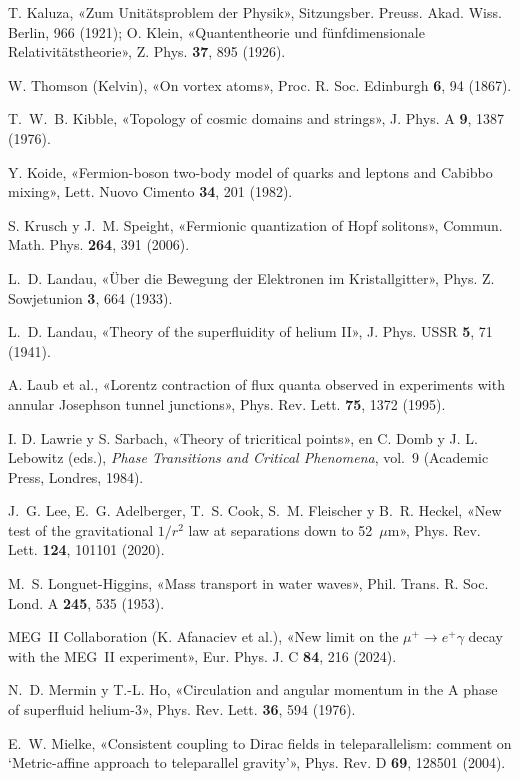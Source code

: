 \documentclass[11pt,a4paper]{article}
\begin{document}
\begin{list}{}{\setlength{\leftmargin}{1.5em}\setlength{\itemindent}{-1.5em}\setlength{\itemsep}{0.15em}\small}
\item T. Kaluza, «Zum Unitätsproblem der Physik», Sitzungsber. Preuss. Akad. Wiss. Berlin, 966 (1921); O. Klein, «Quantentheorie und fünfdimensionale Relativitätstheorie», Z. Phys. \textbf{37}, 895 (1926).
\item W. Thomson (Kelvin), «On vortex atoms», Proc. R. Soc. Edinburgh \textbf{6}, 94 (1867).
\item T.~W.~B. Kibble, «Topology of cosmic domains and strings», J. Phys. A \textbf{9}, 1387 (1976).
\item Y. Koide, «Fermion-boson two-body model of quarks and leptons and Cabibbo mixing», Lett. Nuovo Cimento \textbf{34}, 201 (1982).
\item S. Krusch y J.~M. Speight, «Fermionic quantization of Hopf solitons», Commun. Math. Phys. \textbf{264}, 391 (2006).
\item L.~D. Landau, «Über die Bewegung der Elektronen im Kristallgitter», Phys. Z. Sowjetunion \textbf{3}, 664 (1933).
\item L.~D. Landau, «Theory of the superfluidity of helium II», J. Phys. USSR \textbf{5}, 71 (1941).
\item A. Laub et al., «Lorentz contraction of flux quanta observed in experiments with annular Josephson tunnel junctions», Phys. Rev. Lett. \textbf{75}, 1372 (1995).
\item I. D. Lawrie y S. Sarbach, «Theory of tricritical points», en C. Domb y J. L. Lebowitz (eds.), \emph{Phase Transitions and Critical Phenomena}, vol.~9 (Academic Press, Londres, 1984).
\item J.~G. Lee, E.~G. Adelberger, T.~S. Cook, S.~M. Fleischer y B.~R. Heckel, «New test of the gravitational $1/r^2$ law at separations down to 52~$\mu$m», Phys. Rev. Lett. \textbf{124}, 101101 (2020).
\item M.~S. Longuet-Higgins, «Mass transport in water waves», Phil. Trans. R. Soc. Lond. A \textbf{245}, 535 (1953).
\item MEG~II Collaboration (K. Afanaciev et al.), «New limit on the $\mu^+\to e^+\gamma$ decay with the MEG~II experiment», Eur. Phys. J. C \textbf{84}, 216 (2024).
\item N.~D. Mermin y T.-L. Ho, «Circulation and angular momentum in the A phase of superfluid helium-3», Phys. Rev. Lett. \textbf{36}, 594 (1976).
\item E.~W. Mielke, «Consistent coupling to Dirac fields in teleparallelism: comment on ‘Metric-affine approach to teleparallel gravity’», Phys. Rev. D \textbf{69}, 128501 (2004).

\end{list}
\end{document}
